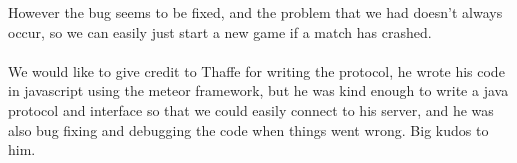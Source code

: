 \documentclass[12pt, a4paper]{article}
\begin{document}
However the bug seems to be fixed, and the problem that we had doesn't always occur, so we can easily just start a new game if a match has crashed. \\ \\
We would like to give credit to Thaffe for writing the protocol, he wrote his code in javascript using the meteor framework, but he was kind enough to write a java protocol and interface so that we could easily connect to his server, and he was also bug fixing and debugging the code when things went wrong. Big kudos to him.
\end{document}
